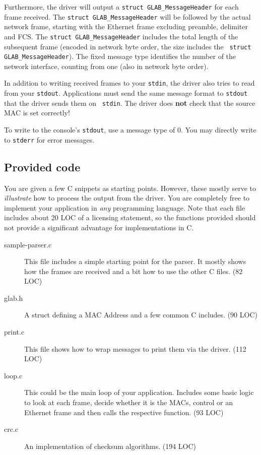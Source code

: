 \documentclass{article}
\begin{document}
Furthermore, the driver will output a {\tt struct GLAB\_MessageHeader}
for each frame received.  The {\tt struct GLAB\_MessageHeader} will be
followed by the actual network frame, starting with the Ethernet frame
excluding preamble, delimiter and FCS.  The {\tt struct
  GLAB\_MessageHeader} includes the total length of the subsequent
frame (encoded in network byte order, the size includes the {\tt
  struct GLAB\_MessageHeader}).  The fixed message type identifies the
number of the network interface, counting from one (also in network
byte order).

In addition to writing received frames to your {\tt stdin}, the driver
also tries to read from your {\tt stdout}.  Applications must send the
same message format to {\tt stdout} that the driver sends them on {\tt
  stdin}.  The driver does {\bf not} check that the source MAC is set
correctly!

To write to the console's {\tt stdout}, use a message type of 0.
You may directly write to {\tt stderr} for error messages.

\subsection{Provided code}

You are given a few C snippets as starting points. However, these
mostly serve to {\em illustrate} how to process the output from the
driver. You are completely free to implement your application in {\em
  any} programming language.  Note that each file includes about 20
LOC of a licensing statement, so the functions provided should not
provide a significant advantage for implementations in C.

\begin{description}
\item[sample-parser.c]{This file includes a simple starting point for
  the parser.  It mostly shows how the frames are received and
  a bit how to use the other C files. (82 LOC)}
\item[glab.h]{A struct defining a MAC Address and a few common C includes. (90 LOC)}
\item[print.c]{This file shows how to wrap messages to print them
  via the driver. (112 LOC)}
\item[loop.c]{This could be the main loop of your application. Includes
  some basic logic to look at each frame, decide whether it is the MACs,
  control or an Ethernet frame and then calls the respective function. (93 LOC)}
\item[crc.c]{An implementation of checksum algorithms. (194 LOC)}
\end{description}
\end{document}
